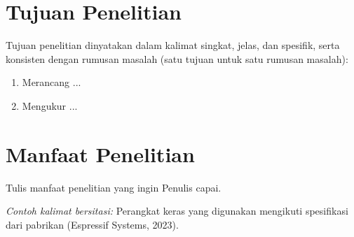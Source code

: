 \section{Tujuan Penelitian}
Tujuan penelitian dinyatakan dalam kalimat singkat, jelas, dan spesifik, serta konsisten dengan rumusan masalah (satu tujuan untuk satu rumusan masalah):
\begin{enumerate}
\item Merancang ...
\item Mengukur ...
\end{enumerate}

\section{Manfaat Penelitian}
Tulis manfaat penelitian yang ingin Penulis capai.

\textit{Contoh kalimat bersitasi:} Perangkat keras yang digunakan mengikuti spesifikasi dari pabrikan (Espressif Systems, 2023).

